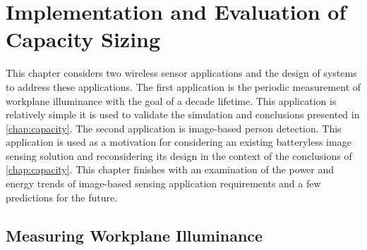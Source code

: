 \chapter{Implementation and Evaluation of Capacity Sizing}
\label{chap:permacam}

This chapter considers two wireless sensor applications and the design of systems to address these applications.
The first application is the periodic measurement of workplane illuminance with the goal of a decade lifetime. This application is relatively simple it is used to validate the simulation and conclusions presented in \cref{chap:capacity}.
The second application is image-based person detection. This application is used as a motivation for considering an existing batteryless image sensing solution and reconsidering its design in the context of the conclusions of \cref{chap:capacity}.
This chapter finishes with an examination of the power and energy trends of image-based sensing application requirements and a few predictions for the future. 

\section{Measuring Workplane Illuminance}
\label{sec:impl:permamote}



